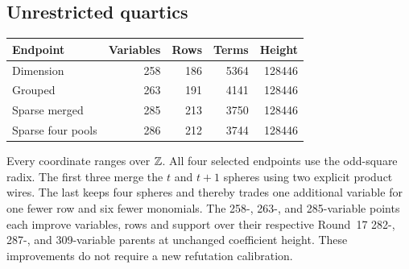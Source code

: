 \subsection{Unrestricted quartics}
\begin{center}\small
\begin{tabular}{@{}lrrrr@{}}\toprule
Endpoint & Variables & Rows & Terms & Height\\\midrule
Dimension &258&186&5364&128446\\
Grouped &263&191&4141&128446\\
Sparse merged &285&213&3750&128446\\
Sparse four pools &286&212&3744&128446\\\bottomrule
\end{tabular}
\end{center}
Every coordinate ranges over $\mathbb Z$. All four selected endpoints use the
odd-square radix. The first three merge the $t$ and $t+1$ spheres using
two explicit product wires. The last keeps four spheres and thereby trades
one additional variable for one fewer row and six fewer monomials.
The 258-, 263-, and 285-variable points each improve variables, rows and
support over their respective Round~17 282-, 287-, and 309-variable parents
at unchanged coefficient height. These improvements do not require a
new refutation calibration.
